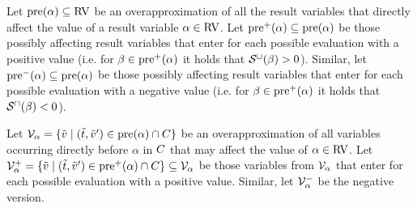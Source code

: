 \begin{definition}
  Let $\text{pre}(\alpha) \subseteq \text{RV}$ be an overapproximation of all the result variables that directly affect the value of a result variable $\alpha \in \text{RV}$.
  Let $\text{pre}^+(\alpha) \subseteq \text{pre}(\alpha)$ be those possibly affecting result variables that enter for each possible evaluation with a positive value
  (i.e. for $\beta \in \text{pre}^+(\alpha)$ it holds that ${\mathcal{S}^\sqcup}(\beta) > 0$).
  Similar, let $\text{pre}^-(\alpha) \subseteq \text{pre}(\alpha)$ be those possibly affecting result variables that enter for each possible evaluation with a negative value
  (i.e. for $\beta \in \text{pre}^+(\alpha)$ it holds that ${\mathcal{S}^\sqcap}(\beta) < 0$).
\end{definition}

\begin{definition}
  Let $\mathcal{V}_\alpha = \lbrace  \tilde{v} \mid (\tilde{t}, \tilde{v}') \in \text{pre}(\alpha) \cap C  \rbrace$ be an overapproximation of all variables occurring directly before $\alpha$ in $C$ that may affect the value of $\alpha \in \text{RV}$.
  Let $\mathcal{V}^+_\alpha = \lbrace  \tilde{v} \mid (\tilde{t}, \tilde{v}') \in \text{pre}^+(\alpha) \cap C  \rbrace \subseteq \mathcal{V}_\alpha$ be those variables from $\mathcal{V}_\alpha$ that enter for each possible evaluation with a positive value.
  Similar, let $\mathcal{V}^-_\alpha$ be the negative version.
\end{definition}


